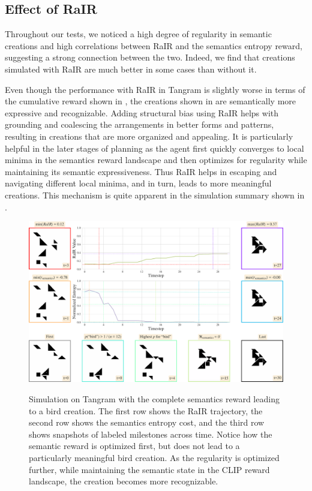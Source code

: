 \newpage
\subsection{Effect of RaIR}
\label{sec:effect-rair}

Throughout our tests, we noticed a high degree of regularity in semantic creations and high correlations between RaIR and the semantics entropy reward, suggesting a strong connection between the two.
Indeed, we find that creations simulated with RaIR are much better in some cases than without it.

Even though the performance with RaIR in Tangram is slightly worse in terms of the cumulative reward shown in , the creations shown in  are semantically more expressive and recognizable.
Adding structural bias using RaIR helps with grounding and coalescing the arrangements in better forms and patterns, resulting in creations that are more organized and appealing.
It is particularly helpful in the later stages of planning as the agent first quickly converges to local minima in the semantics reward landscape and then optimizes for regularity while maintaining its semantic expressiveness.
Thus RaIR helps in escaping and navigating different local minima, and in turn, leads to more meaningful creations.
This mechanism is quite apparent in the simulation summary shown in .

\begin{figure}[h]
    \centering
    \href{https://drive.google.com/file/d/1zhw-571KImEE4OPbpeWEA9SAKPv4r7F3}{\includegraphics[width=\textwidth]{images/sim_rair_later_bird_cropped.pdf}}
    \caption[Simulation on Tangram with the complete semantics reward leading to a bird creation.]{Simulation on Tangram with the complete semantics reward leading to a bird creation. The first row shows the RaIR trajectory, the second row shows the semantics entropy cost, and the third row shows snapshots of labeled milestones across time. Notice how the semantic reward is optimized first, but does not lead to a particularly meaningful bird creation. As the regularity is optimized further, while maintaining the semantic state in the CLIP reward landscape, the creation becomes more recognizable.}
    \label{fig:sim}
\end{figure}

